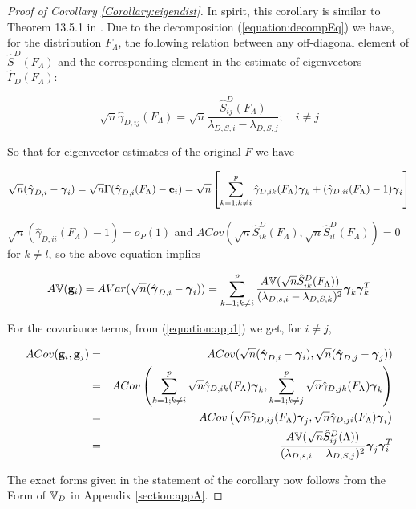 \begin{proof}[Proof of Corollary \ref{Corollary:eigendist}]
In spirit, this corollary is similar to Theorem 13.5.1 in \cite{anderson}. Due to the decomposition (\ref{equation:decompEq}) we have, for the distribution $F_\Lambda$, the following relation between any off-diagonal element of $\hat S^D(F_\Lambda)$ and the corresponding element in the estimate of eigenvectors $\hat\Gamma_D (F_\Lambda)$:

$$ \sqrt n \hat\gamma_{D,ij} (F_\Lambda) = \sqrt n \frac{\hat S^D_{ij} (F_\Lambda)}{\lambda_{D,S,i} - \lambda_{D,S,j}}; \quad i \neq j$$

So that for eigenvector estimates of the original $F$ we have

\begin{equation} \label{equation:app1}
\sqrt n (\hat{{\boldsymbol{\gamma}}}_{D,i} - {\boldsymbol{\gamma}}_i) = \sqrt n \Gamma (\hat {{\boldsymbol{\gamma}}}_{D,i}(F_\Lambda) - {\bf{e}}_i ) = \sqrt n \left[ \sum_{k=1; k \neq i}^p \hat \gamma_{D,ik}(F_\Lambda){\boldsymbol{\gamma}}_k + (\hat \gamma_{D,ii}(F_\Lambda) - 1){\boldsymbol{\gamma}}_i \right]
\end{equation}

$\sqrt n (\hat \gamma_{D,ii}(F_\Lambda) - 1) =  o_P(1)$ and $ACov(\sqrt n \hat S^D_{ik}(F_\Lambda), \sqrt n \hat S^D_{il}(F_\Lambda)) = 0$ for $k \neq l$, so the above equation implies

$$ A{\mathbb{V}}({\bf{g}}_i) = AVar (\sqrt n (\hat{{\boldsymbol{\gamma}}}_{D,i} - {\boldsymbol{\gamma}}_i)) = \sum_{k=1; k \neq i}^p \frac{A{\mathbb{V}}(\sqrt n \hat S^D_{ik}(F_\Lambda))}{(\lambda_{D,s,i} - \lambda_{D,S,k})^2} {\boldsymbol{\gamma}}_k {\boldsymbol{\gamma}}_k^T $$

For the covariance terms, from (\ref{equation:app1}) we get, for $i \neq j$,

\begin{eqnarray*}
ACov({\bf{g}}_i, {\bf{g}}_j) &=& ACov (\sqrt n (\hat{{\boldsymbol{\gamma}}}_{D,i} - {\boldsymbol{\gamma}}_i), \sqrt n (\hat{{\boldsymbol{\gamma}}}_{D,j} - {\boldsymbol{\gamma}}_j))\\
&=& ACov \left( \sum_{k=1; k \neq i}^p \sqrt n \hat \gamma_{D,ik}(F_\Lambda){\boldsymbol{\gamma}}_k, \sum_{k=1; k \neq j}^p \sqrt n \hat \gamma_{D,jk}(F_\Lambda){\boldsymbol{\gamma}}_k \right)\\
&=& ACov \left( \sqrt n \hat \gamma_{D,ij}(F_\Lambda){\boldsymbol{\gamma}}_j, \sqrt n \hat \gamma_{D,ji}(F_\Lambda){\boldsymbol{\gamma}}_i \right)\\
&=& - \frac{A{\mathbb{V}}(\sqrt n \hat S^D_{ij}(\Lambda))}{(\lambda_{D,s,i} - \lambda_{D,S,j})^2} {\boldsymbol{\gamma}}_j {\boldsymbol{\gamma}}_i^T
\end{eqnarray*}

The exact forms given in the statement of the corollary now follows from the  Form of ${\mathbb{V}}_D$ in Appendix \ref{section:appA}.


\end{proof}
